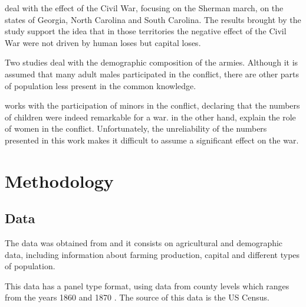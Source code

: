 \documentclass[11pt]{beamer}
\begin{document}
\begin{frame}
 \citet{feigenbaum2018capital} deal with the effect of the Civil War, focusing on the Sherman march, on the states of Georgia, North Carolina and South Carolina. The results brought by the study support the idea that in those territories the negative effect of the Civil War were not driven by human loses but capital loses.
\end{frame}

\begin{frame}
	Two studies deal with the demographic composition of the armies. Although it is assumed that many adult males participated in the conflict, there are other parts of population less present in the common knowledge.
	
	\vspace{\baselineskip}
	\citet{murphy1993boys} works with the participation of minors in the conflict, declaring that the numbers of children were indeed remarkable for a war. \citet{blanton2002they} in the other hand, explain the role of women in the conflict. Unfortunately, the unreliability of the numbers presented in this work makes it difficult to assume a significant effect on the war.
\end{frame}

\section{Methodology}
\subsection{Data}
\begin{frame}

The data was obtained from \citet{nhgis} and it consists on agricultural and demographic data, including information about farming production, capital and different types of population.

\vspace{\baselineskip}
This data has a panel type format, using data from county levels which ranges from the years 1860 and 1870 . The source of this data is the US Census.
\end{frame}
\end{document}
